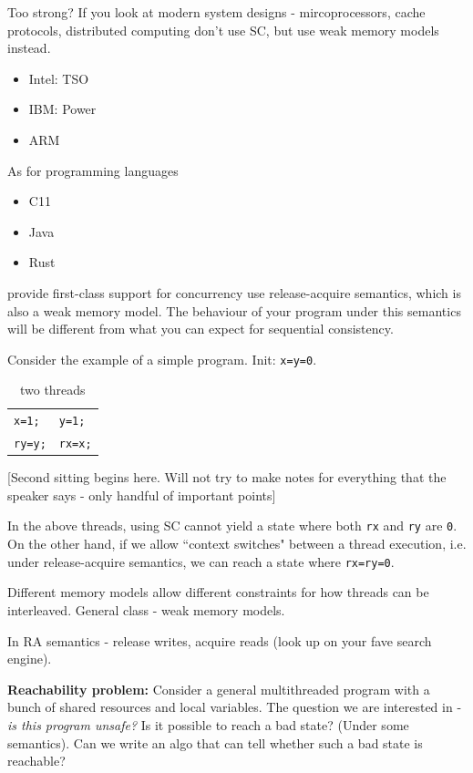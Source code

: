 \documentclass[a4paper]{article}
\begin{document}
Too strong? If you look at modern system designs - mircoprocessors, cache protocols,
distributed computing don't use SC, but use weak memory models instead.

\begin{itemize}
	\item Intel: TSO
	\item IBM: Power
	\item ARM
\end{itemize}

As for programming languages
\begin{itemize}
	\item C11
	\item Java
	\item Rust
\end{itemize}
provide first-class support for concurrency use release-acquire semantics,
which is also a weak memory model. The
behaviour of your program under this semantics will be different from
what you can expect for sequential consistency.

Consider the example of a simple program. Init: \texttt{x=y=0}.
\begin{table}[h]
	\centering
	\caption{two threads}
	\label{tab:ex2}
	\begin{tabular}{l l}
	\texttt{x=1;} & \texttt{y=1;} \\
	\texttt{ry=y;} & \texttt{rx=x;}
	\end{tabular}
\end{table}

[Second sitting begins here. Will not try to make notes for everything
that the speaker says - only handful of important points]

In the above threads, using SC cannot yield a state where both \texttt{rx} and \texttt{ry} are \texttt{0}. On the other hand, if we allow
``context switches" between a thread execution, i.e. under release-acquire
semantics, we can reach a state where \texttt{rx=ry=0}.

Different memory models allow different  constraints for how threads
can be interleaved. General class - weak memory models.

In RA semantics - release writes, acquire reads (look up on your
fave search engine). 

\textbf{Reachability problem:} Consider a general multithreaded program with a bunch of shared
resources and local variables. The question we are interested in -
\emph{is this program unsafe?} Is it possible to reach a bad state?
(Under some semantics). Can we write an algo that can tell whether
such a bad state is reachable?
\end{document}
